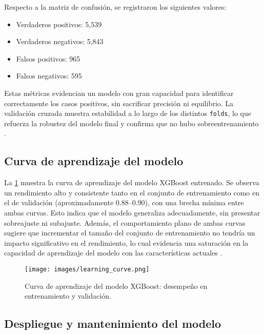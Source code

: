 \documentclass[12pt]{article}
\begin{document}
\noindent Respecto a la matriz de confusión, se registraron los siguientes valores:

\begin{itemize}
    \item Verdaderos positivos: 5,539
    \item Verdaderos negativos: 5,843
    \item Falsos positivos: 965
    \item Falsos negativos: 595
\end{itemize}

Estas métricas evidencian un modelo con gran capacidad para identificar correctamente los casos positivos, sin sacrificar precisión ni equilibrio. La validación cruzada muestra estabilidad a lo largo de los distintos \texttt{folds}, lo que refuerza la robustez del modelo final y confirma que no hubo sobreentrenamiento \citep{geron2019hands}.

\subsection{Curva de aprendizaje del modelo}

La \cref{fig:learning_curve} muestra la curva de aprendizaje del modelo XGBoost entrenado. Se observa un rendimiento alto y consistente tanto en el conjunto de entrenamiento como en el de validación (aproximadamente 0.88–0.90), con una brecha mínima entre ambas curvas. Esto indica que el modelo generaliza adecuadamente, sin presentar sobreajuste ni subajuste. Además, el comportamiento plano de ambas curvas sugiere que incrementar el tamaño del conjunto de entrenamiento no tendría un impacto significativo en el rendimiento, lo cual evidencia una saturación en la capacidad de aprendizaje del modelo con las características actuales \citep{raschka2018,chen2016}.

\begin{figure}[H]
    \centering
    \texttt{[image: images/learning\_curve.png]}
    \caption{Curva de aprendizaje del modelo XGBoost: desempeño en entrenamiento y validación.}
    \label{fig:learning_curve}
\end{figure}


\subsection{Despliegue y mantenimiento del modelo}
\end{document}
